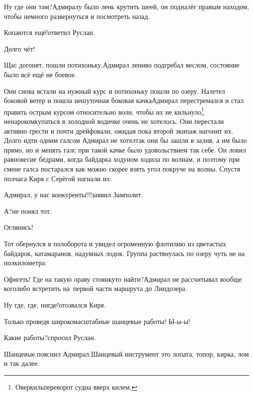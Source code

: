 \diagdash Ну где они там?\mdash Адмиралу было лень крутить шеей, он подналёг правым находом, чтобы немного развернуться и посмотреть назад.

\diagdash Копаются ещё!\mdash ответил Руслан.

\diagdash Долго чёт!

\diagdash Щас догонят, пошли потихоньку.\mdash Адмирал лениво подгребал веслом, состояние было всё ещё не боевое.

\renewcommand*{\thefootnote}{\fnsymbol{footnote}}
\setcounter{footnote}{0}
Они снова встали на нужный курс и потихоньку пошли по озеру. Налетел боковой ветер и пошла нешуточная боковая качка\mdash Адмирал перестремался и стал править острым курсом относительно волн, чтобы их не кильнуло\footnote{Оверкиль\mdash переворот судна вверх килем\cite{МорскойСправочник}.} ненароком\mdash купаться в холодной водичке очень не хотелось. Они перестали активно грести и почти дрейфовали, ожидая пока второй экипаж нагонит их. Долго идти одним галсом Адмирал не хотел\mdash так они бы зашли в залив, а им было прямо, но и менять галс при такой качке было удовольствием так себе. Он ловил равновесие бёдрами, когда байдарка ходуном ходила по волнам, и поэтому при смене галса постарался как можно скорее взять угол покруче на волны. Спустя полчаса Киря с Серёгой нагнали их:


\diagdash Адмирал, у нас конкуренты!!!\mdash заявил Замполит.

\diagdash А?\mdash не понял тот.

\diagdash Оглянись!

Тот обернулся в пол\sdash оборота и увидел огроменную флотилию из цветастых байдарок, катамаранов, надувных лодок. Группа растянулась по озеру чуть не на полкилометра: 

\diagdash Офигеть! Где на такую ораву стоянку\sdash то найти?\mdash Адмирал не рассчитывал вообще кого\sdash либо встретить на~первой части маршрута до Линдозера.

\diagdash Ну где, где, нигде!\mdash отозвался Киря. 

\diagdash Только проведя широкомасштабные шанцевые работы! Ы-ы-ы!

\diagdash Какие работы?\mdash спросил Руслан.

\diagdash Шанцевые.\mdash пояснил Адмирал.\mdash Шанцевый инструмент это лопата, топор, кирка, лом и так далее.

